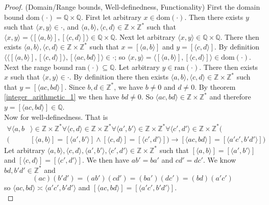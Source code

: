 \documentclass{report}
\begin{document}
\begin{proof}(Domain/Range bounds, Well-definedness, Functionality)
First the domain bound dom$(\cdot)=\mathbb Q\times\mathbb Q$. First let arbitrary $x\in\text{dom}(\cdot)$. Then there exists $y$ such that $\langle x,y\rangle\in\cdot$, and 
$\langle a,b\rangle,\langle c,d\rangle\in\mathbb Z\times\mathbb Z^*$ such that $\langle x,y\rangle=\langle[\langle a,b\rangle],[\langle c,d\rangle]\rangle\in\mathbb Q\times\mathbb Q$. Next let 
arbitrary $\langle x,y\rangle\in\mathbb Q\times\mathbb Q$.
There then exists $\langle a,b\rangle,\langle c,d\rangle\in\mathbb Z\times\mathbb Z^*$ such that $x=[\langle a,b\rangle]$ and $y=[\langle c,d\rangle]$. By definition 
$\langle\langle[\langle a,b\rangle],[\langle c,d\rangle]\rangle,[\langle ac,bd\rangle]\rangle\in\cdot$; so $\langle x,y\rangle=\langle[\langle a,b\rangle],[\langle c,d\rangle]\rangle\in\text{dom}(\cdot)$.\\
\indent Next the range bound ran$(\cdot)\subseteq\mathbb Q$.
Let arbitrary $y\in\text{ran}(\cdot)$. There then exists $x$ such that $\langle x,y\rangle\in\cdot$. By definition there then exists 
$\langle a,b\rangle,\langle c,d\rangle\in\mathbb Z\times\mathbb Z^*$ such that $y=[\langle ac,bd\rangle]$. Since $b,d\in\mathbb Z^*$, we have $b\neq0$ and $d\neq0$. 
By theorem \ref{integer_arithmetic_1} we then have $bd\neq0$. So $\langle ac,bd\rangle\in\mathbb Z\times\mathbb Z^*$ and therefore $y=[\langle ac,bd\rangle]\in\mathbb Q$.\\
\indent Now for well-definedness. That is
\begin{align*}
\forall\langle a,b&\rangle\in\mathbb Z\times\mathbb Z^*\forall\langle c,d\rangle\in\mathbb Z\times\mathbb Z^*\forall\langle a',b'\rangle\in\mathbb Z\times\mathbb Z^*\forall\langle c',d'\rangle\in\mathbb Z\times\mathbb Z^*(\\
(&[\langle a,b\rangle]=[\langle a',b'\rangle]\land[\langle c,d\rangle]=[\langle c',d'\rangle])
\to[\langle ac,bd\rangle]=[\langle a'c',b'd'\rangle])
\end{align*}
Let arbitrary $\langle a,b\rangle,\langle c,d\rangle,\langle a',b'\rangle,\langle c',d'\rangle\in\mathbb Z\times\mathbb Z^*$ such that 
$[\langle a,b\rangle]=[\langle a',b'\rangle]$ and $[\langle c,d\rangle]=[\langle c',d'\rangle]$.
We then have $ab'=ba'$ and $cd'=dc'$. We know $bd,b'd'\in\mathbb Z^*$ and
\begin{equation*}
(ac)(b'd')=(ab')(cd')=(ba')(dc')=(bd)(a'c')
\end{equation*}
so $\langle ac,bd\rangle\asymp\langle a'c',b'd'\rangle$ and $[\langle ac,bd\rangle]=[\langle a'c',b'd'\rangle]$.\\

\end{proof}
\end{document}
